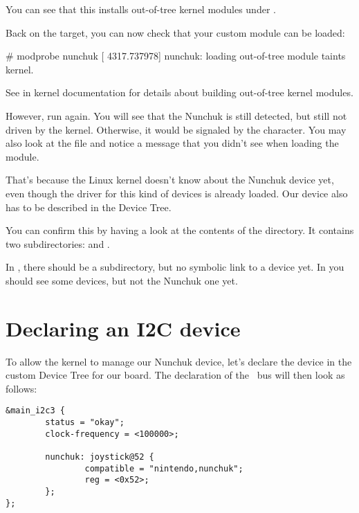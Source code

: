 You can see that this installs out-of-tree kernel modules under
.

Back on the target, you can now check that your custom module can
be loaded:

\begin{bashinput}
# modprobe nunchuk
[ 4317.737978] nunchuk: loading out-of-tree module taints kernel.
\end{bashinput}

See  in kernel documentation
for details about building out-of-tree kernel modules.

However, run  again. You will see that the
Nunchuk is still detected, but still not driven by the kernel.
Otherwise, it would be signaled by the  character. You
may also look at the  file and notice a
 message that you didn't
see when loading the module.

That's because the Linux kernel doesn't know about the Nunchuk
device yet, even though the driver for this kind of devices is
already loaded. Our device also has to be described in the Device Tree.

You can confirm this by having a look at the contents of the
 directory.  It contains two subdirectories:
 and .

In , there should be a  subdirectory,
but no symbolic link to a device yet. In  you should
see some devices, but not the Nunchuk one yet.

\section{Declaring an I2C device}

To allow the kernel to manage our Nunchuk device, let's declare the
device in the custom Device Tree for our board. The declaration of the \busname\ 
bus will then look as follows:

\begin{verbatim}
&main_i2c3 {
        status = "okay";
        clock-frequency = <100000>;

        nunchuk: joystick@52 {
                compatible = "nintendo,nunchuk";
                reg = <0x52>;
        };
};
\end{verbatim}

